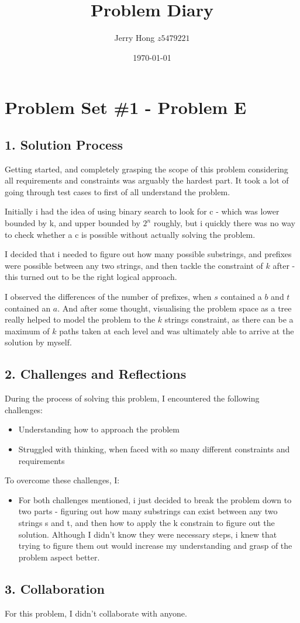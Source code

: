 \documentclass[a4paper,12pt]{article}
\title{Problem Diary}
\author{Jerry Hong $z5479221$}
\date{\today}
\begin{document}
\maketitle

\section*{Problem Set \#1 - Problem E}

\subsection*{1. Solution Process}

Getting started, and completely grasping the scope of this problem considering all requirements and constraints was arguably the hardest part. It took a lot of going through test cases to first of all understand the problem.

Initially i had the idea of using binary search to look for c - which was lower bounded by k, and upper bounded by $2^n$ roughly, but i quickly there was no way to check whether a c is possible without actually solving the problem.

I decided that i needed to figure out how many possible substrings, and prefixes were possible between any two strings, and then tackle the constraint of $k$ after - this turned out to be the right logical approach.

I observed the differences of the number of prefixes, when $s$ contained a $b$ and $t$ contained an $a$. And after some thought, visualising the problem space as a tree really helped to model the problem to the $k$ strings constraint, as there can be a maximum of $k$ paths taken at each level and was ultimately able to arrive at the solution by myself.

\subsection*{2. Challenges and Reflections}
During the process of solving this problem, I encountered the following challenges:
\begin{itemize}
    \item Understanding how to approach the problem
    \item Struggled with thinking, when faced with so many different constraints and requirements
\end{itemize}

To overcome these challenges, I:
\begin{itemize}
    \item For both challenges mentioned, i just decided to break the problem down to two parts - figuring out how many substrings can exist between any two strings s and t, and then how to apply the k constrain to figure out the solution. Although I didn't know they were necessary steps, i knew that trying to figure them out would increase my understanding and grasp of the problem aspect better.
\end{itemize}

\subsection*{3. Collaboration}
For this problem, I didn't collaborate with anyone.
\end{document}
